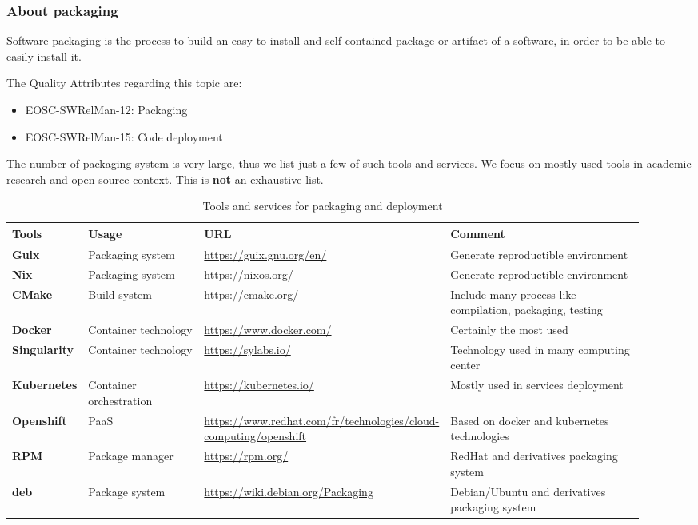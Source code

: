 \subsubsection{About packaging}

Software packaging is the process to build an easy to install and self contained package or artifact of a software, in order to be able to easily install it.

The Quality Attributes regarding this topic are:

\begin{itemize}
  \item EOSC-SWRelMan-12: Packaging
  \item EOSC-SWRelMan-15: Code deployment
\end{itemize}

The number of packaging system is very large, thus we list just a few of such tools and services. We focus on mostly used tools in academic research and open
source context. This is {\bf not} an exhaustive list.

\begin{center}
\begin{table}[h]

  \small
  \begin{tabular}{|p{0.12\linewidth}|p{0.2\linewidth}|p{0.25\linewidth}|p{0.35\linewidth}|} \hline

    \textbf{Tools} & \textbf{Usage} & \textbf{URL} & \textbf{Comment} \\ \hline \hline
    \textbf{Guix} & Packaging system & \url{https://guix.gnu.org/en/} & Generate reproductible environment \\ \hline
    \textbf{Nix} & Packaging system & \url{https://nixos.org/} & Generate reproductible environment \\ \hline
    \textbf{CMake} & Build system & \url{https://cmake.org/} & Include many process like compilation, packaging, testing  \\ \hline
    \textbf{Docker} & Container technology & \url{https://www.docker.com/} &  Certainly the most used \\ \hline
    \textbf{Singularity} & Container technology & \url{https://sylabs.io/} & Technology used in many computing center  \\ \hline
    \textbf{Kubernetes} & Container orchestration & \url{https://kubernetes.io/} & Mostly used in services deployment  \\ \hline
    \textbf{Openshift} & PaaS & \url{https://www.redhat.com/fr/technologies/cloud-computing/openshift} & Based on docker and kubernetes technologies  \\ \hline
    \textbf{RPM} & Package manager & \url{https://rpm.org/} & RedHat and derivatives packaging system \\ \hline
    \textbf{deb} & Package system & \url{https://wiki.debian.org/Packaging} & Debian/Ubuntu and derivatives packaging system \\ \hline

  \end{tabular}
  \caption{Tools and services for packaging and deployment}
  \label{tab:tools_pack01}
\end{table}
\end{center}

